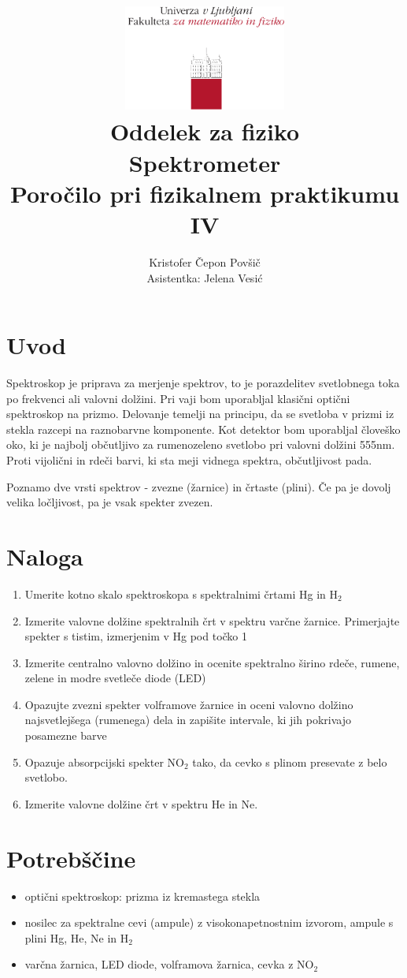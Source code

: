 \documentclass[12pt]{report}
\title{
  \includegraphics[width=0.4\textwidth]{fmf_logo}\\
  {\small Oddelek za fiziko} \\
  {Spektrometer}\\
  {\small Poročilo pri fizikalnem praktikumu IV}\\

}
\date{}
\author{ Kristofer Čepon Povšič \\[5 cm]
 \small  Asistentka: Jelena Vesić  \\
}
\begin{document}
\setcounter{page}{2}

\maketitle

\chapter*{Uvod}

Spektroskop je priprava za merjenje spektrov, to je porazdelitev svetlobnega toka po frekvenci ali valovni dolžini. Pri vaji bom uporabljal klasični optični spektroskop na prizmo. Delovanje temelji na principu, da se svetloba v prizmi iz stekla razcepi na raznobarvne komponente. Kot detektor bom uporabljal človeško oko, ki je najbolj občutljivo za rumenozeleno svetlobo pri valovni dolžini 555nm. Proti vijolični in rdeči barvi, ki sta meji vidnega spektra, občutljivost pada. 

Poznamo dve vrsti spektrov - zvezne (žarnice) in črtaste (plini). Če pa je dovolj velika ločljivost, pa je vsak spekter zvezen. 

\chapter*{Naloga}

\begin{enumerate}
  \item Umerite kotno skalo spektroskopa s spektralnimi črtami Hg in $\text{H}_2$
  \item Izmerite valovne dolžine spektralnih črt v spektru varčne žarnice. Primerjajte spekter s tistim, izmerjenim v Hg pod točko 1
  \item Izmerite centralno valovno dolžino in ocenite spektralno širino rdeče, rumene, zelene in modre svetleče diode (LED) 
  \item Opazujte zvezni spekter volframove žarnice in oceni valovno dolžino najsvetlejšega (rumenega) dela in zapišite intervale, ki jih pokrivajo posamezne barve
  \item Opazuje absorpcijski spekter $\text{NO}_2$ tako, da cevko s plinom presevate z belo svetlobo. 
  \item Izmerite valovne dolžine črt v spektru He in Ne. 
\end{enumerate}

\begingroup
\let\clearpage\relax

\chapter*{Potrebščine}
\begin{itemize}
  \item optični spektroskop: prizma iz kremastega stekla
  \item nosilec za spektralne cevi (ampule) z visokonapetnostnim izvorom, ampule s plini Hg, He, Ne in $\text{H}_2$
  \item varčna žarnica, LED diode, volframova žarnica, cevka z $\text{NO}_2$
\end{itemize}
\end{document}
